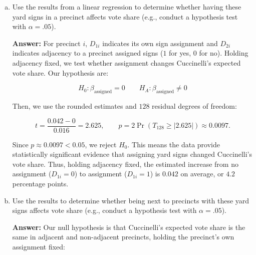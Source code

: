 \documentclass[12pt,letterpaper]{article}
\newcommand{\rcode}[2]{}
\newcommand{\answer}{\par\vspace{.18cm}\noindent\textbf{Answer:} }
\begin{document}
\begin{enumerate}[(a)]
\setlength{\itemsep}{4pt}\setlength{\parsep}{2pt}
\item Use the results from a linear regression to determine whether having these yard signs in a precinct affects vote share (e.g., conduct a hypothesis test with $\alpha=.05$).

\answer For precinct $i$, $D_{1i}$ indicates its own sign assignment and $D_{2i}$ indicates adjacency to a precinct assigned signs ($1$ for yes, $0$ for no). Holding adjacency fixed, we test whether assignment changes Cuccinelli's expected vote share. Our hypothesis are:

$$H_0:\beta_{\mathrm{assigned}}=0  \qquad H_A:\beta_{\mathrm{assigned}}\ne 0$$

Then, we use the rounded estimates and $128$ residual degrees of freedom:

$$t=\frac{0.042-0}{0.016}=2.625,\qquad p=2\Pr(T_{128}\geq |2.625|)\approx 0.0097.$$

\newpage

\rcode{68}{73}

\par\nobreak
{\setlength{\tabcolsep}{4pt}\renewcommand{\arraystretch}{0.93}%
\noindent{}\par}
\smallskip

Since $p\approx0.0097<0.05$, we reject $H_0$. This means the data provide statistically significant evidence that assigning yard signs changed Cuccinelli's vote share. Thus, holding adjacency fixed, the estimated increase from no assignment ($D_{1i}=0$) to assignment ($D_{1i}=1$) is $0.042$ on average, or $4.2$ percentage points.

\item Use the results to determine whether being next to precincts with these yard signs affects vote share (e.g., conduct a hypothesis test with $\alpha=.05$).

\answer Our null hypothesis is that Cuccinelli's expected vote share is the same in adjacent and non-adjacent precincts, holding the precinct's own assignment fixed:


\end{enumerate}
\end{document}
